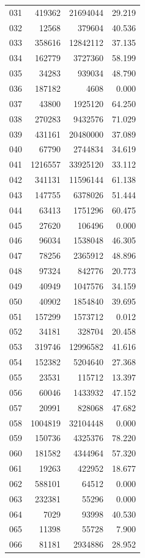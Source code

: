 \documentclass[anonymous,notoc]{gmcm2026}
\begin{document}
\begin{longtable}{lrrr}
031 & 419362 & 21694044 & 29.219 \\
032 & 12568 & 379604 & 40.536 \\
033 & 358616 & 12842112 & 37.135 \\
034 & 162779 & 3727360 & 58.199 \\
035 & 34283 & 939034 & 48.790 \\
036 & 187182 & 4608 & 0.000 \\
037 & 43800 & 1925120 & 64.250 \\
038 & 270283 & 9432576 & 71.029 \\
039 & 431161 & 20480000 & 37.089 \\
040 & 67790 & 2744834 & 34.619 \\
041 & 1216557 & 33925120 & 33.112 \\
042 & 341131 & 11596144 & 61.138 \\
043 & 147755 & 6378026 & 51.444 \\
044 & 63413 & 1751296 & 60.475 \\
045 & 27620 & 106496 & 0.000 \\
046 & 96034 & 1538048 & 46.305 \\
047 & 78256 & 2365912 & 48.896 \\
048 & 97324 & 842776 & 20.773 \\
049 & 40949 & 1047576 & 34.159 \\
050 & 40902 & 1854840 & 39.695 \\
051 & 157299 & 1573712 & 0.012 \\
052 & 34181 & 328704 & 20.458 \\
053 & 319746 & 12996582 & 41.616 \\
054 & 152382 & 5204640 & 27.368 \\
055 & 23531 & 115712 & 13.397 \\
056 & 60046 & 1433932 & 47.152 \\
057 & 20991 & 828068 & 47.682 \\
058 & 1004819 & 32104448 & 0.000 \\
059 & 150736 & 4325376 & 78.220 \\
060 & 181582 & 4344964 & 57.320 \\
061 & 19263 & 422952 & 18.677 \\
062 & 588101 & 64512 & 0.000 \\
063 & 232381 & 55296 & 0.000 \\
064 & 7029 & 93998 & 40.530 \\
065 & 11398 & 55728 & 7.900 \\
066 & 81181 & 2934886 & 28.952 \\

\end{longtable}
\end{document}
